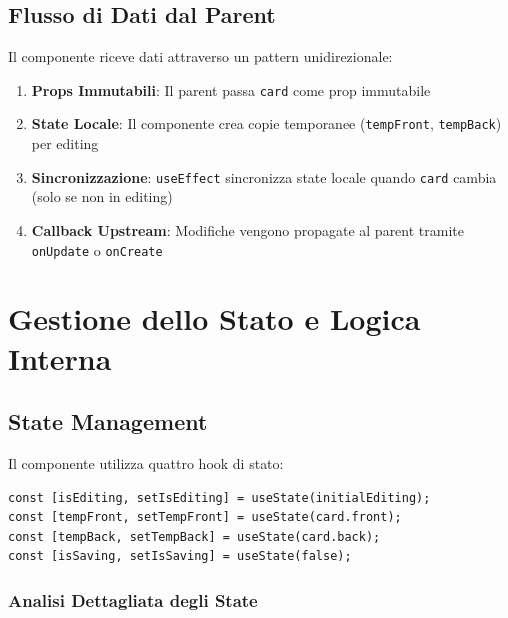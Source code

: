 \documentclass[11pt,a4paper]{article}
\begin{document}
\subsection{Flusso di Dati dal Parent}

Il componente riceve dati attraverso un pattern unidirezionale:

\begin{enumerate}
    \item \textbf{Props Immutabili}: Il parent passa \texttt{card} come prop immutabile
    \item \textbf{State Locale}: Il componente crea copie temporanee (\texttt{tempFront}, \texttt{tempBack}) per editing
    \item \textbf{Sincronizzazione}: \texttt{useEffect} sincronizza state locale quando \texttt{card} cambia (solo se non in editing)
    \item \textbf{Callback Upstream}: Modifiche vengono propagate al parent tramite \texttt{onUpdate} o \texttt{onCreate}
\end{enumerate}


\section{Gestione dello Stato e Logica Interna}

\subsection{State Management}

Il componente utilizza quattro hook di stato:

\begin{lstlisting}[style=typescript, caption=State Hooks]
const [isEditing, setIsEditing] = useState(initialEditing);
const [tempFront, setTempFront] = useState(card.front);
const [tempBack, setTempBack] = useState(card.back);
const [isSaving, setIsSaving] = useState(false);
\end{lstlisting}

\subsubsection{Analisi Dettagliata degli State}
\end{document}
